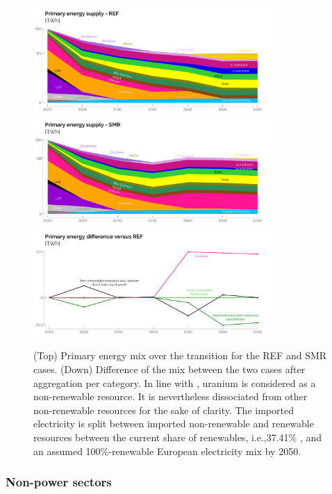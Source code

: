 \documentclass[11pt,twoside,a4paper,english]{article}
\def\ie{i.e.,}
\begin{document}
\begin{figure}[htbp!]
\centering
\includegraphics[width=0.8\textwidth]{Primary_mix_REF.pdf}
\includegraphics[width=0.8\textwidth]{Primary_mix_SMR.pdf}
\includegraphics[width=0.8\textwidth]{Primary_mix_diff_uranium.pdf}
\caption{(Top) Primary energy mix over the transition for the REF and SMR cases. (Down) Difference of the mix between the two cases after aggregation per category. In line with \citet{rixhon2021terminology}, uranium is considered as a non-renewable resource. It is nevertheless dissociated from other non-renewable resources for the sake of clarity. The imported electricity is split between imported non-renewable and renewable resources between the current share of renewables, \ie 37.41\% \cite{eurostat_share_re_elec}, and an assumed 100\%-renewable European electricity mix by 2050.}
\label{fig:results_deter_energy_mix}
\end{figure}

\newpage
\subsubsection{Non-power sectors}
\label{subsubsec:atom_mol:results_deter_others}
\end{document}
